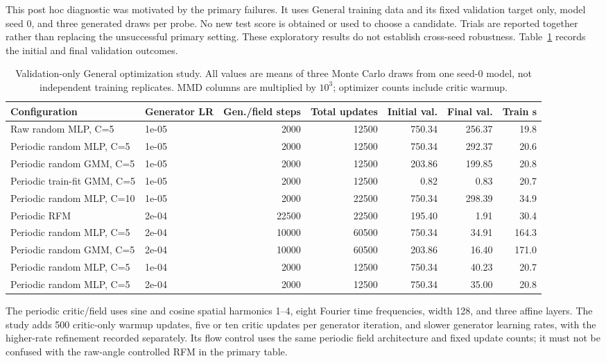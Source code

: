 This post hoc diagnostic was motivated by the primary failures. It uses General training data and its fixed validation target only, model seed 0, and three generated draws per probe. No new test score is obtained or used to choose a candidate. Trials are reported together rather than replacing the unsuccessful primary setting. These exploratory results do not establish cross-seed robustness.
Table~\ref{tab:stability} records the initial and final validation outcomes.
\begin{table}[t]\caption{Validation-only General optimization study. All values are means of three Monte Carlo draws from one seed-0 model, not independent training replicates. MMD columns are multiplied by $10^3$; optimizer counts include critic warmup.}\label{tab:stability}\centering\small
\begin{tabular}{@{}llrrrrr@{}}\toprule
Configuration & Generator LR & Gen./field steps & Total updates & Initial val. & Final val. & Train s \\
\midrule
Raw random MLP, C=5 & 1e-05 & 2000 & 12500 & 750.34 & 256.37 & 19.8 \\
Periodic random MLP, C=5 & 1e-05 & 2000 & 12500 & 750.34 & 292.37 & 20.6 \\
Periodic random GMM, C=5 & 1e-05 & 2000 & 12500 & 203.86 & 199.85 & 20.8 \\
Periodic train-fit GMM, C=5 & 1e-05 & 2000 & 12500 & 0.82 & 0.83 & 20.7 \\
Periodic random MLP, C=10 & 1e-05 & 2000 & 22500 & 750.34 & 298.39 & 34.9 \\
Periodic RFM & 2e-04 & 22500 & 22500 & 195.40 & 1.91 & 30.4 \\
Periodic random MLP, C=5 & 2e-04 & 10000 & 60500 & 750.34 & 34.91 & 164.3 \\
Periodic random GMM, C=5 & 2e-04 & 10000 & 60500 & 203.86 & 16.40 & 171.0 \\
Periodic random MLP, C=5 & 1e-04 & 2000 & 12500 & 750.34 & 40.23 & 20.7 \\
Periodic random MLP, C=5 & 2e-04 & 2000 & 12500 & 750.34 & 35.00 & 20.8 \\
\bottomrule\end{tabular}\end{table}
The periodic critic/field uses sine and cosine spatial harmonics 1--4, eight Fourier time frequencies, width 128, and three affine layers. The study adds 500 critic-only warmup updates, five or ten critic updates per generator iteration, and slower generator learning rates, with the higher-rate refinement recorded separately. Its flow control uses the same periodic field architecture and fixed update counts; it must not be confused with the raw-angle controlled RFM in the primary table.
